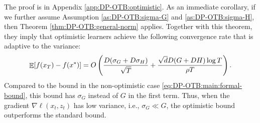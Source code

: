 The proof is in Appendix \ref{app:DP-OTB:optimistic}.
As an immediate corollary, if we further assume Assumption \ref{as:DP-OTB:sigma-G} and \ref{as:DP-OTB:sigma-H}, then Theorem \ref{thm:DP-OTB:general-norm} applies. Together with this theorem, they imply that optimistic learners achieve the following convergence rate that is adaptive to the variance:
\begin{equation}
    \mathop{\mathbb{E}}[f(x_T)-f(x^*)] = O\left( \frac{D(\sigma_G+D\sigma_H)}{\sqrt{T}} + \frac{\sqrt{d}D(G+DH)\log T}{\rho T} \right).
    \label{eq:DP-OTB:optimistic:formal-bound}
\end{equation}
Compared to the bound in the non-optimistic case \eqref{eq:DP-OTB:main:formal-bound}, this bound has $\sigma_G$ instead of $G$ in the first term. Thus, when the gradient $\nabla\ell(x_t,z_t)$ has low variance, i.e., $\sigma_G\ll G$, the optimistic bound outperforms the standard bound.